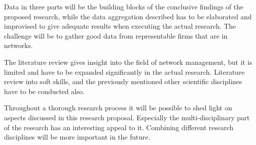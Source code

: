 \documentclass[12pt,journal,compsoc]{IEEEtran}
\begin{document}
Data in three parts will be the building blocks of the conclusive findings of
the proposed research, while the data aggregation described has to be
elaborated and improvised to give adequate results when executing the actual
research. The challenge will be to gather good data from representable firms
that are in networks.   

The literature review gives insight into the field of network management, but
it is limited and have to be expanded significantly in the actual research.
Literature review into soft skills, and the previously mentioned other
scientific disciplines have to be conducted also. 

Throughout a thorough research process it will be possible to shed light on
aspects discussed in this research proposal. Especially the multi-disciplinary
part of the research has an interesting appeal to it. Combining different
research disciplines will be more important in the future. 


%


\end{document}
